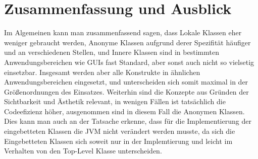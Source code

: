 \chapter{Zusammenfassung und Ausblick}

Im Algemeinen kann man zusammenfassend sagen, dass Lokale Klassen eher weniger gebraucht werden, Anonyme Klassen aufgrund derer Spezifität häufiger und an verschiedenen Stellen, und Innere Klassen sind in bestimmten Anwendungsbereichen wie GUIs fast Standard, aber sonst auch nicht so vielsetig einsetzbar.
Insgesamt werden aber alle Konstrukte in ähnlichen Anwendungsbereichen eingesetzt, und unterscheiden sich somit maximal in der Größenordnungen des Einsatzes.
Weiterhin sind die Konzepte aus Gründen der Sichtbarkeit und Ästhetik relevant, in wenigen Fällen ist tatsächlich die Codeefizienz höher, ausgenommen sind in diesem Fall die Anonymen Klassen.
Dies kann man auch an der Tatsache erkenne, dass für die Implementierung der eingebetteten Klassen die JVM nicht verändert werden musste, da sich die Eingebetteten Klassen sich soweit nur in der Implemtierung und leicht im Verhalten von den Top-Level Klasse unterscheiden.


\newpage
